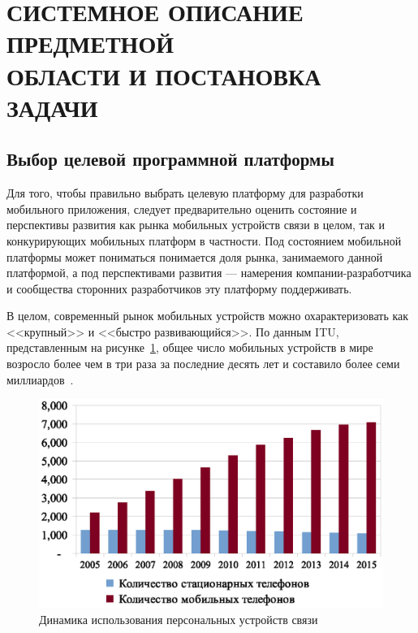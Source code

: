 \section[Системное описание предметной области и постановка задачи]{%
  СИСТЕМНОЕ ОПИСАНИЕ ПРЕДМЕТНОЙ \\
  ОБЛАСТИ И ПОСТАНОВКА ЗАДАЧИ
}\label{sec:spec}

\subsection{Выбор целевой программной платформы}

Для того, чтобы правильно выбрать целевую платформу для разработки
мобильного приложения, следует предварительно оценить состояние и
перспективы развития как рынка мобильных устройств связи в целом,
так и конкурирующих мобильных платформ в частности.
Под состоянием мобильной платформы может пониматься понимается
доля рынка, занимаемого данной платформой,
а под перспективами развития --- намерения компании-разработчика и
сообщества сторонних разработчиков эту платформу поддерживать.

В целом, современный рынок мобильных устройств можно охарактеризовать
как <<крупный>> и <<быстро развивающийся>>.
По данным ITU, представленным на рисунке~\ref{fig:stat_phone},
общее число мобильных устройств в мире возросло
более чем в три раза за последние десять лет
и составило более семи миллиардов~\cite{itu_stat_phone}.

\begin{figure}[h!]
  \centering
  \includegraphics[width=150mm]{fig/stat_phone.eps}
  \caption{Динамика использования персональных устройств связи}
  \label{fig:stat_phone}
\end{figure}

